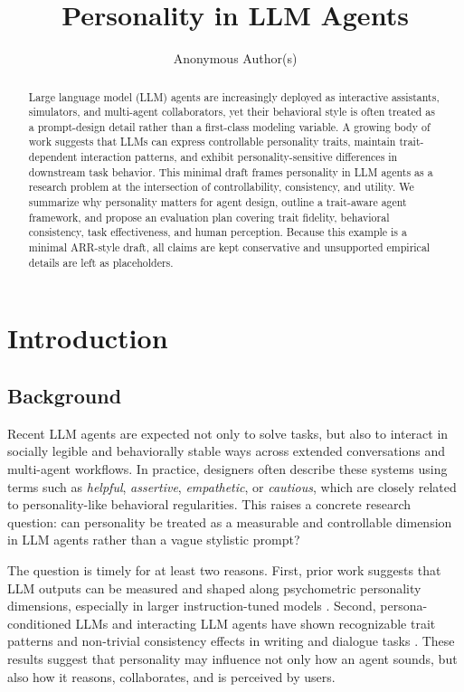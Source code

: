 \documentclass[11pt]{article}
\title{Personality in LLM Agents}
\author{Anonymous Author(s)}
\begin{document}
\maketitle

\begin{abstract}
Large language model (LLM) agents are increasingly deployed as interactive assistants, simulators, and multi-agent collaborators, yet their behavioral style is often treated as a prompt-design detail rather than a first-class modeling variable. A growing body of work suggests that LLMs can express controllable personality traits, maintain trait-dependent interaction patterns, and exhibit personality-sensitive differences in downstream task behavior. This minimal draft frames personality in LLM agents as a research problem at the intersection of controllability, consistency, and utility. We summarize why personality matters for agent design, outline a trait-aware agent framework, and propose an evaluation plan covering trait fidelity, behavioral consistency, task effectiveness, and human perception. Because this example is a minimal ARR-style draft, all claims are kept conservative and unsupported empirical details are left as placeholders.
\end{abstract}

\section{Introduction}

\subsection{Background}
Recent LLM agents are expected not only to solve tasks, but also to interact in socially legible and behaviorally stable ways across extended conversations and multi-agent workflows. In practice, designers often describe these systems using terms such as \emph{helpful}, \emph{assertive}, \emph{empathetic}, or \emph{cautious}, which are closely related to personality-like behavioral regularities. This raises a concrete research question: can personality be treated as a measurable and controllable dimension in LLM agents rather than a vague stylistic prompt?

The question is timely for at least two reasons. First, prior work suggests that LLM outputs can be measured and shaped along psychometric personality dimensions, especially in larger instruction-tuned models \cite{personalitytraitsllm2023}. Second, persona-conditioned LLMs and interacting LLM agents have shown recognizable trait patterns and non-trivial consistency effects in writing and dialogue tasks \cite{personallm2023,interaction2024}. These results suggest that personality may influence not only how an agent sounds, but also how it reasons, collaborates, and is perceived by users.
\end{document}
